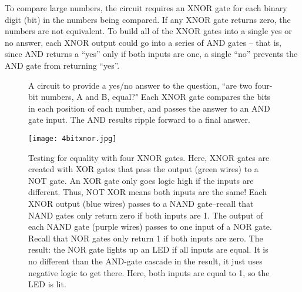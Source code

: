To compare large numbers, the circuit requires an XNOR gate for each binary digit (bit) in the numbers being compared. If any XNOR gate returns zero, the numbers are not equivalent. To build all of the XNOR gates into a single yes or no answer, each XNOR output could go into a series of AND gates -- that is, since AND returns a ``yes'' only if both inputs are one, a single ``no'' prevents the AND gate from returning ``yes''. 


\begin{figure}[h!]
\begin{center}

\caption{A circuit to provide a yes/no answer to the question, ``are  two four-bit numbers, A and B, equal?" Each XNOR gate compares the bits in each position of each number, and passes the answer to an AND gate input. The AND results ripple forward to a final answer.}
\end{center}
\end{figure}


\begin{figure}[h!]
\begin{center}
\texttt{[image: 4bitxnor.jpg]}
\caption{Testing for equality with four XNOR gates. Here, XNOR gates are created with XOR gates that pass the output (green wires) to a NOT gate. An XOR gate only goes logic high if the inputs are different. Thus, NOT XOR means both inputs are the same! Each XNOR output (blue wires) passes to a NAND gate--recall that NAND gates only return zero if both inputs are 1. The output of each NAND gate (purple wires) passes to one input of a NOR gate. Recall that NOR gates only return 1 if both inputs are zero. The result: the NOR gate lights up an LED if all inputs are equal. It is no different than the AND-gate cascade in the result, it just uses negative logic to get there. Here, both inputs are equal to 1, so the LED is lit.}
\end{center}
\end{figure}







\clearpage


